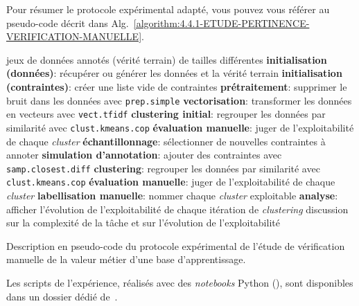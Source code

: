 			Pour résumer le protocole expérimental adapté, vous pouvez vous référer au pseudo-code décrit dans Alg.~\ref{algorithm:4.4.1-ETUDE-PERTINENCE-VERIFICATION-MANUELLE}.
			\begin{algorithm}[!htb]
				\begin{algorithmic}[1]
					\Require jeux de données annotés (vérité terrain) de tailles différentes
					\State \textbf{initialisation (données)}: récupérer ou générer les données et la vérité terrain
					\State \textbf{initialisation (contraintes)}: créer une liste vide de contraintes
					\State \textbf{prétraitement}: supprimer le bruit dans les données avec \texttt{prep.simple}
					\State \textbf{vectorisation}: transformer les données en vecteurs avec \texttt{vect.tfidf}
					\State \textbf{clustering initial}: regrouper les données par similarité avec \texttt{clust.kmeans.cop}
					\State \textbf{évaluation manuelle}: juger de l'exploitabilité de chaque \textit{cluster}
					\Repeat
						\State \textbf{échantillonnage}: sélectionner de nouvelles contraintes à annoter
						\State \textbf{simulation d'annotation}: ajouter des contraintes avec \texttt{samp.closest.diff}
						\State \textbf{clustering}: regrouper les données par similarité avec \texttt{clust.kmeans.cop}
						\State \textbf{évaluation manuelle}: juger de l'exploitabilité de chaque \textit{cluster}
						\State \textbf{labellisation manuelle}: nommer chaque \textit{cluster} exploitable
					\State \textbf{analyse}: afficher l'évolution de l'exploitabilité de chaque itération de \textit{clustering}
					\Ensure discussion sur la complexité de la tâche et sur l'évolution de l'exploitabilité
				\end{algorithmic}
				\caption{Description en pseudo-code du protocole expérimental de l'étude de vérification manuelle de la valeur métier d'une base d'apprentissage.}
				\label{algorithm:4.4.1-ETUDE-PERTINENCE-VERIFICATION-MANUELLE}
			\end{algorithm}
				
			
			
			
			\begin{leftBarInformation}
				Les scripts de l'expérience, réalisés avec des \textit{notebooks} Python (\cite{van-rossum-drake:2009:python-reference-manual}), sont disponibles dans un dossier dédié de~\cite{schild:2021:cognitivefactory-interactiveclusteringcomparativestudy}.
			\end{leftBarInformation}
			


